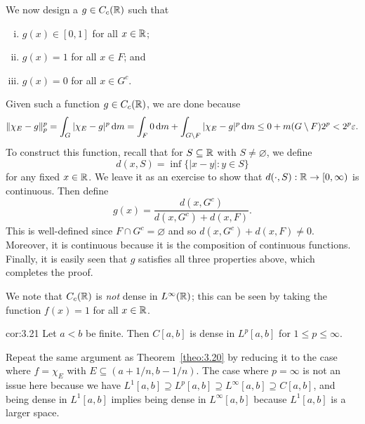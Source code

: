 \begin{pf}
    We now design a $g \in C_c(\mathbb{R})$ such that 
    \begin{enumerate}[(i)]
        \item $g(x) \in [0, 1]$ for all $x \in \mathbb{R}$; 
        \item $g(x) = 1$ for all $x \in F$; and 
        \item $g(x) = 0$ for all $x \in G^c$. 
    \end{enumerate}
    Given such a function $g \in C_c(\mathbb{R})$, we are done because 
    \[ \|\chi_E - g\|_p^p = \int_G |\chi_E - g|^p \,\mathrm{d} m 
    = \int_F 0\,\mathrm{d} m + \int_{G\setminus F} |\chi_E - g|^p\,\mathrm{d} m 
    \leq 0 + m(G \setminus F) 2^p < 2^p\varepsilon. \] 
    To construct this function, recall that for $S \subseteq \mathbb{R}$ with 
    $S \neq \varnothing$, we define 
    \[ d(x, S) = \inf\{|x - y| : y \in S\} \] 
    for any fixed $x \in \mathbb{R}$. We leave it as an exercise to show that 
    $d(\cdot, S) : \mathbb{R} \to [0, \infty)$ is continuous. Then define 
    \[ g(x) = \frac{d(x, G^c)}{d(x, G^c) + d(x, F)}. \] 
    This is well-defined since $F \cap G^c = \varnothing$ 
    and so $d(x, G^c) + d(x, F) \neq 0$. Moreover, it is continuous 
    because it is the composition of continuous functions. Finally, 
    it is easily seen that $g$ satisfies all three properties above, 
    which completes the proof.
\end{pf}

We note that $C_c(\mathbb{R})$ is \emph{not} dense in $L^\infty(\mathbb{R})$; this can be 
seen by taking the function $f(x) = 1$ for all $x \in \mathbb{R}$. 

\begin{cor}{cor:3.21}
    Let $a < b$ be finite. Then $C[a, b]$ is dense in $L^p[a, b]$ for 
    $1 \leq p \leq \infty$. 
\end{cor}
\begin{pf}
    Repeat the same argument as Theorem~\ref{theo:3.20} by reducing it to 
    the case where $f = \chi_E$ with $E \subseteq (a + 1/n, b - 1/n)$. 
    The case where $p = \infty$ is not an issue here because we have 
    $L^1[a, b] \supseteq L^p[a, b] \supseteq L^\infty[a, b] \supseteq 
    C[a, b]$, and being dense in $L^1[a, b]$ implies being dense in 
    $L^\infty[a, b]$ because $L^1[a, b]$ is a larger space. 
\end{pf}
